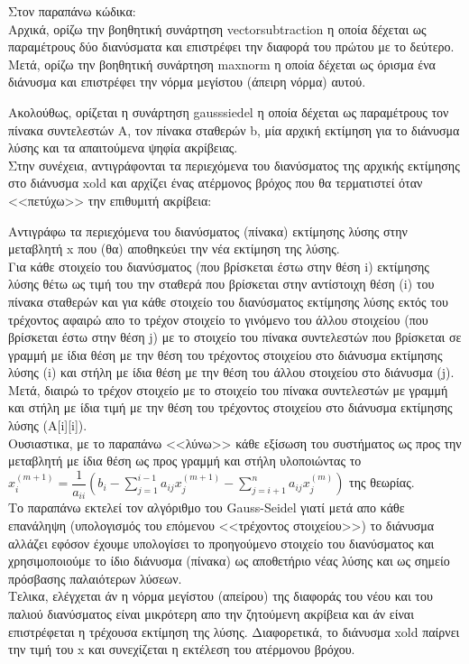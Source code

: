 \documentclass[a4paper,11pt]{article}
\newcommand{\lt}{\latintext}
\begin{document}
Στον παραπάνω κώδικα:\\
Αρχικά, ορίζω την βοηθητική συνάρτηση {\lt vector\textunderscore subtraction} η οποία δέχεται ως παραμέτρους δύο διανύσματα και επιστρέφει την διαφορά του πρώτου με το δεύτερο.\\
Μετά, ορίζω την βοηθητική συνάρτηση {\lt max\textunderscore norm} η οποία δέχεται ως όρισμα ένα διάνυσμα και επιστρέφει την νόρμα μεγίστου (άπειρη νόρμα) αυτού.\\
\par
Ακολούθως, ορίζεται η συνάρτηση {\lt gauss\textunderscore siedel} η οποία δέχεται ως παραμέτρους τον πίνακα συντελεστών Α, τον πίνακα σταθερών {\lt b}, μία αρχική εκτίμηση για το διάνυσμα λύσης και τα απαιτούμενα ψηφία ακρίβειας.\\
Στην συνέχεια, αντιγράφονται τα περιεχόμενα του διανύσματος της αρχικής εκτίμησης στο διάνυσμα {\lt x\textunderscore old} και αρχίζει ένας ατέρμονος βρόχος που θα τερματιστεί όταν <<πετύχω>> την επιθυμιτή ακρίβεια:
\par
Αντιγράφω τα περιεχόμενα του διανύσματος (πίνακα) εκτίμησης λύσης στην μεταβλητή {\lt x} που (θα) αποθηκεύει την νέα εκτίμηση της λύσης.\\
Για κάθε στοιχείο του διανύσματος (που βρίσκεται έστω στην θέση {\lt i}) εκτίμησης λύσης θέτω ως τιμή του την σταθερά που βρίσκεται στην αντίστοιχη θέση ({\lt i}) του πίνακα σταθερών και για κάθε στοιχείο του διανύσματος εκτίμησης λύσης εκτός του τρέχοντος αφαιρώ απο το τρέχον στοιχείο το γινόμενο του άλλου στοιχείου (που βρίσκεται έστω στην θέση {\lt j}) με το στοιχείο του πίνακα συντελεστών που βρίσκεται σε γραμμή με ίδια θέση με την θέση του τρέχοντος στοιχείου στο διάνυσμα εκτίμησης λύσης ({\lt i}) και στήλη με ίδια θέση με την θέση του άλλου στοιχείου στο διάνυσμα ({\lt j}). Μετά, διαιρώ το τρέχον στοιχείο με το στοιχείο του πίνακα συντελεστών με γραμμή και στήλη με ίδια τιμή με την θέση του τρέχοντος στοιχείου στο διάνυσμα εκτίμησης λύσης ({\lt A[i][i]}).\\
Ουσιαστικα, με το παραπάνω <<λύνω>> κάθε εξίσωση του συστήματος ως προς την μεταβλητή με ίδια θέση ως προς γραμμή και στήλη υλοποιώντας το {\lt $x_i^{(m+1)} = \dfrac{1}{a_{ii}}(b_i - \sum_{j=1}^{i-1}a_{ij}x_j^{(m+1)} - \sum_{j=i+1}^{n}a_{ij}x_j^{(m)})$} της θεωρίας.\\
Το παραπάνω εκτελεί τον αλγόριθμο του {\lt Gauss-Seidel} γιατί μετά απο κάθε επανάληψη (υπολογισμός του επόμενου <<τρέχοντος στοιχείου>>) το διάνυσμα αλλάζει εφόσον έχουμε υπολογίσει το προηγούμενο στοιχείο του διανύσματος και χρησιμοποιούμε το ίδιο διάνυσμα (πίνακα) ως αποθετήριο νέας λύσης και ως σημείο πρόσβασης παλαιότερων λύσεων.\\
Τελικα, ελέγχεται άν η νόρμα μεγίστου (απείρου) της διαφοράς του νέου και του παλιού διανύσματος είναι μικρότερη απο την ζητούμενη ακρίβεια και άν είναι επιστρέφεται η τρέχουσα εκτίμηση της λύσης. Διαφορετικά, το διάνυσμα {\lt x\textunderscore old} παίρνει την τιμή του {\lt x} και συνεχίζεται η εκτέλεση του ατέρμονου βρόχου.\\
\end{document}

